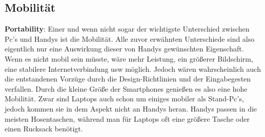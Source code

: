 \subsection{Mobilität}

\myNewSection
\textbf{Portability}: Einer und wenn nicht sogar der wichtigste Unterschied zwischen Pc's und Handys ist die Mobilität. Alle zuvor erwähnten Unterschiede sind also eigentlich nur eine Auswirkung dieser von Handys gewünschten Eigenschaft. Wenn es nicht mobil sein müsste, wäre mehr Leistung, ein größerer Bildschirm, eine stabilere Internetverbindung usw möglich. Jedoch wären wahrscheinlich auch die entstandenen Vorzüge durch die Design-Richtlinien und der Eingabegesten verfallen. \newline%
Durch die kleine Größe der Smartphones genießen es also eine hohe Mobilität. Zwar sind Laptops auch schon um einiges mobiler als Stand-Pc's, jedoch kommen sie in dem Aspekt nicht an Handys heran. Handys passen in die meisten Hosentaschen, während man für Laptops oft eine größere Tasche oder einen Rucksack benötigt. \newline%

